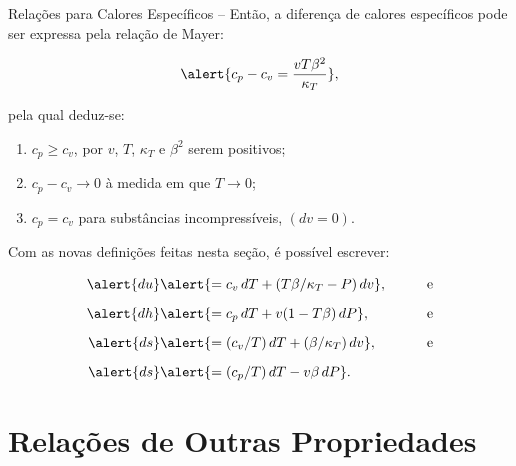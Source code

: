 \begin{frame}[allowframebreaks]{Relações para Calores Específicos --}
        \pagebreak
        Então, a diferença de calores específicos pode ser expressa pela \alert{relação de
        Mayer}:

        \begin{equation*}
            \alert{
                c_p - c_v =
                    \frac{vT\beta^2}{\kappa_T}
            },
        \end{equation*}

        \noindent pela qual deduz-se:\vspace*\medskipamount

        \begin{enumerate}
            \item \alert{$c_p \geqslant c_v$}, por $v$, $T$, $\kappa_T$ e $\beta^2$ serem
                positivos;
            \item \alert{$c_p - c_v \to 0$ à medida em que $T \to 0$};
            \item \alert{$c_p = c_v$ para substâncias incompressíveis}, $(dv = 0)$.
        \end{enumerate}

        \pagebreak
        Com as novas definições feitas nesta seção, é possível escrever:\vspace*\smallskipamount

        \begin{alignat*}{2}
            \alert{du}  &
            \alert{= c_v\,dT + (T\beta/\kappa_T - P)\,dv},
            &\qquad &\mbox{e} \\[\medskipamount]
            \alert{dh}  &
            \alert{= c_p\,dT + v(1 - T\beta)\,dP},
            & &\mbox{e} \\[\medskipamount]
            \alert{ds}  &
            \alert{= (c_v/T)\,dT + (\beta/\kappa_T)\,dv},
            & &\mbox{e} \\[\medskipamount]
            \alert{ds}  &
            \alert{= (c_p/T)\,dT - v\beta\,dP}.
        \end{alignat*}

    \end{frame}

\section{Relações de Outras Propriedades}

